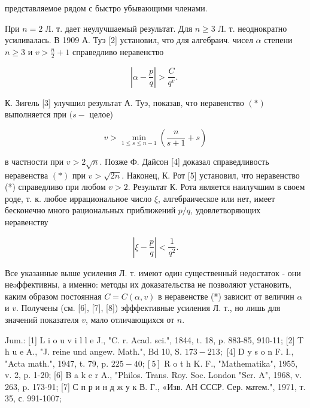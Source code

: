 \documentclass[10pt]{article}
\begin{document}
представляемое рядом с быстро убывающими членами.



При $n=2$ Л. т. дает неулучшаемый результат. Для $n \geqslant 3$ Л. т. неоднократно усиливалась. В 1909 А. Туэ [2] установил, что для алгебраич. чисел $\alpha$ степени $n \geqslant 3$ и $v>\frac{n}{2}+1$ справедливо неравенство



\[

\left|\alpha-\frac{p}{q}\right|>\frac{C}{q^{v}} \text {. }

\]



К. Зигель [3] улучшил результат А. Туэ, показав, что неравенство $(*)$ выполняется при $(s-$ целое)



\[

v>\min _{1 \leqslant s \leqslant n-1}\left(\frac{n}{s+1}+s\right)

\]



в частности при $v>2 \sqrt{n}$. Позже Ф. Дайсон [4] доказал справедливость неравенства $(*)$ при $v>\sqrt{2 n}$. Наконец, К. Рот [5] установил, что неравенство (*) справедливо при любом $v>2$. Результат К. Рота является наилучшим в своем роде, т. к. любое иррациональное число $\xi$, алгебраическое или нет, имеет бесконечно много рациональных приближений $p / q$, удовлетворяющих неравенству



\[

\left|\xi-\frac{p}{q}\right|<\frac{1}{q^{2}} .

\]



Все указанные выше усиления Л. т. имеют один существенный недостаток - они неəффективны, а именно: методы их доказательства не позволяют установить, каким образом постоянная $C=C(\alpha, v)$ в неравенстве (*) зависит от величин $\alpha$ и $v$. Получены (см. [6], [7], [8]) эфффективные усиления Л. т., но лишь для значений показателя $v$, мало отличающихся от $n$.



Jum.: [1] L i o u v i l l e J., "C. r. Acad. sci.", 1844, t. 18, p. 883-85, 910-11; [2] T h u e A., "J. reine und angew. Math.", Bd 10, S. $173-213 ;$ [4] D y s o n F. I., "Acta math.", 1947, t. 79, p. $225-40 ;[5]$ R o t h K. F., "Mathematika", 1955, v. 2, p. 1-20; [6] B a k e r A., "Philos. Trans. Roy. Soc. London "Ser. A", 1968, v. 263, p. 173-91; [7] С п р и н д ж у к В. Г., «Изв. АН СССР. Сер. матем.", 1971, т. 35, с. 991-1007;
\end{document}
